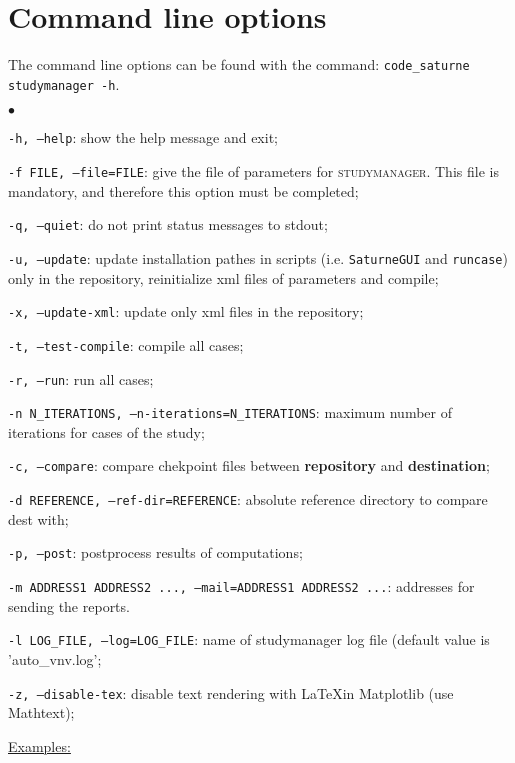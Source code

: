 \documentclass[a4paper,10pt,twoside]{csshortdoc}
\begin{document}
\section{Command line options}

The command line options can be found with the command: \texttt{code\_saturne
studymanager -h}.

\begin{list}{$\bullet$}{}
\item \texttt{-h, --help}: show the help message and exit;
\item \texttt{-f FILE, --file=FILE}: give the file of parameters for
\textsc{studymanager}. This file is mandatory, and therefore this option must be
completed;
\item \texttt{-q, --quiet}: do not print status messages to stdout;
\item \texttt{-u, --update}: update installation pathes in scripts (i.e. \texttt{SaturneGUI} and
  \texttt{runcase}) only in the repository, reinitialize xml files of parameters and compile;
\item \texttt{-x, --update-xml}: update only xml files in the repository;
\item \texttt{-t, --test-compile}: compile all cases;
\item \texttt{-r, --run}: run all cases;
\item \texttt{-n N\_ITERATIONS, --n-iterations=N\_ITERATIONS}: maximum number of iterations for cases of the study;
\item \texttt{-c, --compare}: compare chekpoint files between
  \textbf{repository} and \textbf{destination};
\item \texttt{-d REFERENCE, --ref-dir=REFERENCE}: absolute reference directory to compare dest with;
\item \texttt{-p, --post}: postprocess results of computations;
\item \texttt{-m ADDRESS1 ADDRESS2 ..., --mail=ADDRESS1 ADDRESS2 ...}: addresses
  for sending the reports.
\item \texttt{-l LOG\_FILE, --log=LOG\_FILE}: name of studymanager log file (default value is 'auto\_vnv.log';
\item \texttt{-z, --disable-tex}: disable text rendering with \LaTeX in Matplotlib (use Mathtext);
\end{list}

\underline{Examples:}
\end{document}
